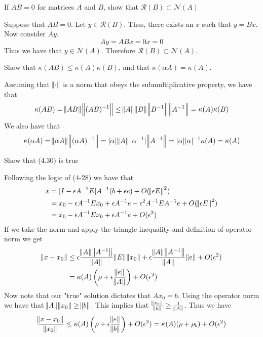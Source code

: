 \documentclass{homework}
\begin{document}
\begin{problem}[4-36]
  If $AB = 0$ for matrices $A$ and $B$, show that $\mathcal{R}(B)  \subset \mathcal{N}(A)$
\end{problem}

\begin{solution}
  Suppose that $AB = 0$. Let $y \in \mathcal{R}(B)$. Thus, there exists an $x$ such that $y = Bx$. Now consider $Ay$.
  \[ Ay = ABx = 0x = 0\]
  Thus we have that $y \in \mathcal{N}(A)$. Therefore $\mathcal{R}(B) \subset \mathcal{N}(A)$.
\end{solution}

\begin{problem}[4-39]
  Show that $\kappa(AB) \leq \kappa(A)\kappa(B)$, and that $\kappa(\alpha A) = \kappa(A)$.
\end{problem}

\begin{solution}
  Assuming that $\norm{\cdot}$ is a norm that obeys the submultiplicative property, we have that
  \[ \kappa(AB) = \norm{AB}\norm{(AB)^{-1}} \leq \norm{A}\norm{B}\norm{B^{-1}}\norm{A^{-1}} = 
  \kappa(A)\kappa(B)\]
  We also have that
  \[ \kappa(\alpha A) = \norm{\alpha A}\norm{(\alpha A)^{-1}} = 
  |\alpha| \norm{A} |\alpha^{-1}|\norm{A^{-1}} = 
|\alpha||\alpha|^{-1} \kappa(A) = \kappa(A)\]
\end{solution}

\begin{problem}[4-42]
  Show that (4.30) is true
\end{problem}

\begin{solution}
  Following the logic of (4-28) we have that
  $$
  \begin{aligned}
    x &= [I - \epsilon A^{-1}E]A^{-1}(b + \epsilon e) + O(\norm{\epsilon E }^2) \\
            &= x_0 - \epsilon A^{-1}Ex_0 + \epsilon A^{-1} e - \epsilon^2 A^{-1}EA^{-1}e + O(\norm{\epsilon E}^2) \\
            &= x_0 - \epsilon A^{-1}Ex_0 + \epsilon A^{-1} e + O(\epsilon^2)
  \end{aligned}
  $$
  If we take the norm and apply the triangle inequality and definition of operator norm we get
  $$
  \begin{aligned}
    \norm{x - x_0} &\leq \epsilon \frac{\norm{A}\norm{A^{-1}}}{\norm{A}}\norm{E}\norm{x_0} + \epsilon \frac{\norm{A}\norm{A^{-1}}}{\norm{A}}\norm{e} + O(\epsilon^2)\\
                   &= \kappa(A)\left(\rho + \epsilon\frac{\norm{e}}{\norm{A}} \right) + O(\epsilon^2)
  \end{aligned}
  $$
  Now note that our "true" solution dictates that $Ax_0 = b$. Using the operator norm we have that $\norm{A}\norm{x_0} \geq \norm{b}$. This implies that $\frac{\norm{x_0}}{\norm{b}} \geq \frac{1}{\norm{A}}$.
  Thus we have
  \[ \frac{\norm{x - x_0}}{\norm{x_0}} \leq \kappa(A)\left(\rho + \epsilon \frac{\norm{e}}{\norm{b}}\right) + O(\epsilon^2) = \kappa(A)(\rho + \rho_b) + O(\epsilon^2)\]
\end{solution}
\end{document}

